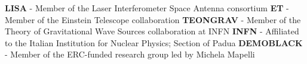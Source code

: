 %
%
%


\begin{contents}
					{\textbf{LISA} - Member of the Laser Interferometer Space Antenna consortium}	
					{\textbf{ET} - Member of the Einstein Telescope collaboration}
					{\textbf{TEONGRAV} - Member of the Theory of Gravitational Wave Sources collaboration at INFN}
					{\textbf{INFN}	- Affiliated to the Italian Institution for Nuclear Physics; Section of Padua}
					{\textbf{DEMOBLACK} - Member of the ERC-funded research group led by Michela Mapelli }
\end{contents}
\medskip